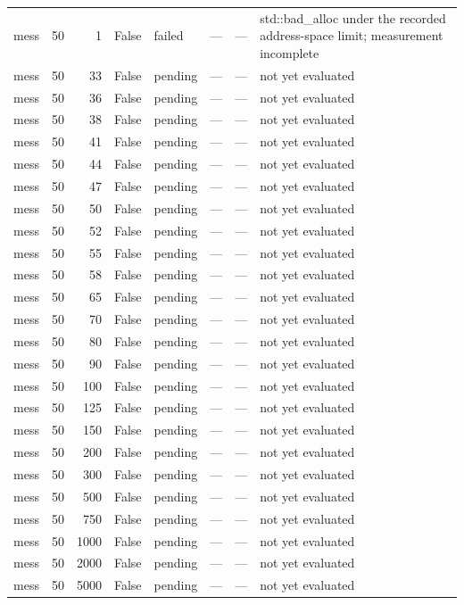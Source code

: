 \begin{tabular}{lrrrlrrl}
mess & 50 & 1 & False & failed & — & — & std::bad\_alloc under the recorded address-space limit; measurement incomplete \\
mess & 50 & 33 & False & pending & — & — & not yet evaluated \\
mess & 50 & 36 & False & pending & — & — & not yet evaluated \\
mess & 50 & 38 & False & pending & — & — & not yet evaluated \\
mess & 50 & 41 & False & pending & — & — & not yet evaluated \\
mess & 50 & 44 & False & pending & — & — & not yet evaluated \\
mess & 50 & 47 & False & pending & — & — & not yet evaluated \\
mess & 50 & 50 & False & pending & — & — & not yet evaluated \\
mess & 50 & 52 & False & pending & — & — & not yet evaluated \\
mess & 50 & 55 & False & pending & — & — & not yet evaluated \\
mess & 50 & 58 & False & pending & — & — & not yet evaluated \\
mess & 50 & 65 & False & pending & — & — & not yet evaluated \\
mess & 50 & 70 & False & pending & — & — & not yet evaluated \\
mess & 50 & 80 & False & pending & — & — & not yet evaluated \\
mess & 50 & 90 & False & pending & — & — & not yet evaluated \\
mess & 50 & 100 & False & pending & — & — & not yet evaluated \\
mess & 50 & 125 & False & pending & — & — & not yet evaluated \\
mess & 50 & 150 & False & pending & — & — & not yet evaluated \\
mess & 50 & 200 & False & pending & — & — & not yet evaluated \\
mess & 50 & 300 & False & pending & — & — & not yet evaluated \\
mess & 50 & 500 & False & pending & — & — & not yet evaluated \\
mess & 50 & 750 & False & pending & — & — & not yet evaluated \\
mess & 50 & 1000 & False & pending & — & — & not yet evaluated \\
mess & 50 & 2000 & False & pending & — & — & not yet evaluated \\
mess & 50 & 5000 & False & pending & — & — & not yet evaluated \\

\end{tabular}

